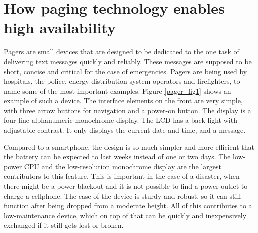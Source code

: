 \documentclass{CML_Seminar_Template}
\begin{document}



\section{How paging technology enables high availability}
Pagers are small devices that are designed to be dedicated to the one task of delivering text messages quickly and reliably. These messages are supposed to be short, concise and critical for the case of emergencies. Pagers are being used by hospitals, the police, energy distribution system operators and firefighters, to name some of the most important examples. Figure \ref{pager_fig1} shows an example of such a device. The interface elements on the front are very simple, with three arrow buttons for navigation and a power-on button. The display is a four-line alphanumeric monochrome display. The LCD has a back-light with adjustable contrast. It only displays the current date and time, and a message.
\par
Compared to a smartphone, the design is so much simpler and more efficient that the battery can be expected to last weeks instead of one or two days. The low-power CPU and the low-resolution monochrome display are the largest contributors to this feature. This is important in the case of a disaster, when there might be a power blackout and it is not possible to find a power outlet to charge a cellphone. The case of the device is sturdy and robust, so it can still function after being dropped from a moderate height. All of this contributes to a low-maintenance device, which on top of that can be quickly and inexpensively exchanged if it still gets lost or broken.
\end{document}
